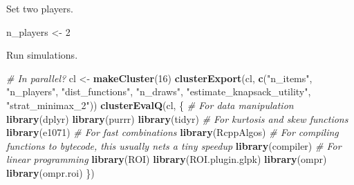 \documentclass[]{article}
\newenvironment{Shaded}{\begin{snugshade}}{\end{snugshade}}
\newcommand{\KeywordTok}[1]{\textcolor[rgb]{0.13,0.29,0.53}{\textbf{#1}}}
\newcommand{\DecValTok}[1]{\textcolor[rgb]{0.00,0.00,0.81}{#1}}
\newcommand{\StringTok}[1]{\textcolor[rgb]{0.31,0.60,0.02}{#1}}
\newcommand{\CommentTok}[1]{\textcolor[rgb]{0.56,0.35,0.01}{\textit{#1}}}
\newcommand{\NormalTok}[1]{#1}
\begin{document}
Set two players.

\begin{Shaded}
\begin{Highlighting}[]
\NormalTok{n_players <-}\StringTok{ }\DecValTok{2}
\end{Highlighting}
\end{Shaded}

Run simulations.

\begin{Shaded}
\begin{Highlighting}[]
\CommentTok{# In parallel?}
\NormalTok{cl <-}\StringTok{ }\KeywordTok{makeCluster}\NormalTok{(}\DecValTok{16}\NormalTok{)}
\KeywordTok{clusterExport}\NormalTok{(cl, }\KeywordTok{c}\NormalTok{(}\StringTok{"n_items"}\NormalTok{, }\StringTok{"n_players"}\NormalTok{, }\StringTok{"dist_functions"}\NormalTok{, }\StringTok{"n_draws"}\NormalTok{, }\StringTok{"estimate_knapsack_utility"}\NormalTok{,}
                    \StringTok{"strat_minimax_2"}\NormalTok{))}
\KeywordTok{clusterEvalQ}\NormalTok{(cl, \{}
  \CommentTok{# For data manipulation}
  \KeywordTok{library}\NormalTok{(dplyr)}
  \KeywordTok{library}\NormalTok{(purrr)}
  \KeywordTok{library}\NormalTok{(tidyr)}
  \CommentTok{# For kurtosis and skew functions}
  \KeywordTok{library}\NormalTok{(e1071)}
  \CommentTok{# For fast combinations}
  \KeywordTok{library}\NormalTok{(RcppAlgos)}
  \CommentTok{# For compiling functions to bytecode, this usually nets a tiny speedup}
  \KeywordTok{library}\NormalTok{(compiler)}
  \CommentTok{# For linear programming}
  \KeywordTok{library}\NormalTok{(ROI)}
  \KeywordTok{library}\NormalTok{(ROI.plugin.glpk)}
  \KeywordTok{library}\NormalTok{(ompr)}
  \KeywordTok{library}\NormalTok{(ompr.roi)}
\NormalTok{\})}
\end{Highlighting}
\end{Shaded}
\end{document}
